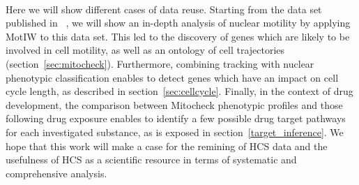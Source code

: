 


\paragraph*{}
Here we will show different cases of data reuse. Starting from the
data set published in ~\cite{pmid20360735}, we will show an in-depth
analysis of nuclear motility by applying MotIW to this data set. 
This led to the discovery of genes which are
likely to be involved in cell motility, as well as an ontology of cell
trajectories (section~\ref{sec:mitocheck}). Furthermore, combining
tracking with nuclear phenotypic classification enables to detect
genes which have an impact on cell cycle length, as described in
section~\ref{sec:cellcycle}. Finally, in the context of drug
development, the comparison between Mitocheck phenotypic profiles and
those following drug exposure enables to identify a few possible drug
target pathways for each investigated substance, as is exposed in
section~\ref{target_inference}. We hope that this work will make a
case for the remining of HCS data and the usefulness of HCS as a
scientific resource in terms of systematic and comprehensive
analysis. 

